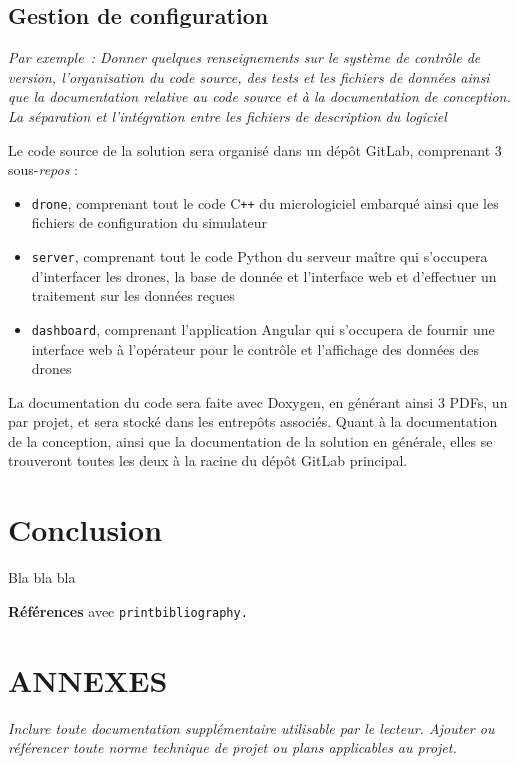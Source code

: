 \documentclass{mistcoursedoc}
\begin{document}
\subsection{Gestion de configuration}

\textit{Par exemple : Donner quelques renseignements sur le système de contrôle de version, l’organisation du code source, des tests et les fichiers de données ainsi que la documentation relative au code source et à la documentation de conception.  La séparation et l’intégration entre les fichiers de description du logiciel}

Le code source de la solution sera organisé dans un dépôt GitLab, comprenant 3 sous-\textit{repos} :
\begin{itemize}
  \item \texttt{drone}, comprenant tout le code C\texttt{++} du micrologiciel embarqué ainsi que les fichiers de configuration du simulateur
  \item \texttt{server}, comprenant tout le code Python du serveur maître qui s'occupera d'interfacer les drones, la base de donnée et l'interface web et d'effectuer un traitement sur les données reçues
  \item \texttt{dashboard}, comprenant l'application Angular qui s'occupera de fournir une interface web à l'opérateur pour le contrôle et l'affichage des données des drones
\end{itemize}

La documentation du code sera faite avec Doxygen, en générant ainsi 3 PDFs, un par projet, et sera stocké dans les entrepôts associés. Quant à la documentation de la conception, ainsi que la documentation de la solution en générale, elles se trouveront toutes les deux à la racine du dépôt GitLab principal.

\section*{Conclusion}

Bla bla bla

\textbf{Références} avec \texttt{printbibliography.}


\section*{ANNEXES}

\textit{Inclure toute documentation supplémentaire utilisable par le lecteur. Ajouter ou référencer toute norme technique de projet ou plans applicables au projet.}
\end{document}
